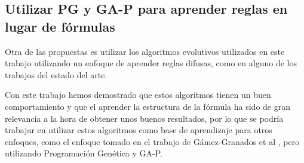 \subsection{Utilizar PG y GA-P para aprender reglas en lugar de fórmulas}

Otra de las propuestas es utilizar los algoritmos evolutivos utilizados en este trabajo utilizando un enfoque de aprender reglas difusas, como en alguno de los trabajos del estado del arte.

Con este trabajo hemos demostrado que estos algoritmos tienen un buen comportamiento y que el aprender la estructura de la fórmula ha sido de gran relevancia a la hora de obtener unos buenos resultados, por lo que se podría trabajar en utilizar estos algoritmos como base de aprendizaje para otros enfoques, como el enfoque tomado en el trabajo de Gámez-Granados et al \cite{NSLVOrdAge}, pero utilizando Programación Genética y GA-P.


